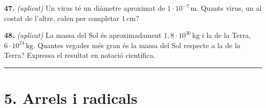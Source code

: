 \documentclass[13pt,a4paper]{extarticle}
\begin{document}
\par\noindent\begin{minipage}{\linewidth}
\textbf{47.} \emph{(aplicat)} Un virus té un diàmetre aproximat de $1\cdot10^{-7}\,\text{m}$. Quants virus, un al costat de l'altre, calen per completar $1\,\text{cm}$?\par
\end{minipage}\par\vspace{1.6mm}
\par\noindent\begin{minipage}{\linewidth}
\textbf{48.} \emph{(aplicat)} La massa del Sol és aproximadament $1{,}8\cdot10^{30}\,\text{kg}$ i la de la Terra, $6\cdot10^{24}\,\text{kg}$. Quantes vegades més gran és la massa del Sol respecte a la de la Terra? Expressa el resultat en notació científica.\par
\end{minipage}\par\vspace{1.6mm}
\vspace{1mm}\hrule\vspace{3mm}

\section*{5. Arrels i radicals}
\end{document}
